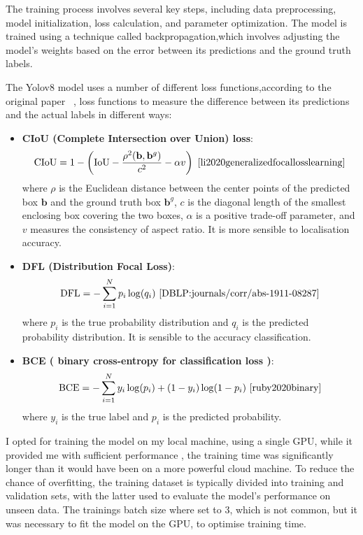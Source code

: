 The training process involves several key steps, including data preprocessing, model initialization,
loss calculation, and parameter optimization.
The model is trained using a technique called backpropagation,which involves adjusting the model's weights based on
the error between its predictions and the ground truth labels.

The Yolov8 model uses a number of different loss functions,according to the original paper~\cite{redmon2016lookonceunifiedrealtime}
, loss functions to measure the difference between its predictions and the actual labels in different ways:



\begin{itemize}
\item \textbf{CIoU (Complete Intersection over Union) loss}:
\[
\text{CIoU} = 1 - \left( \text{IoU} - \frac{\rho^2(\mathbf{b}, \mathbf{b}^g)}{c^2} - \alpha v \right) ~\cite{li2020generalizedfocallosslearning}
\]
where \(\rho\) is the Euclidean distance between the center points of the predicted box \(\mathbf{b}\) and
 the ground truth box \(\mathbf{b}^g\), \(c\) is the diagonal length of the smallest enclosing box covering
 the two boxes, \(\alpha\) is a positive trade-off parameter, and \(v\) measures the consistency of aspect
 ratio.
 It is more sensible to localisation accuracy.

\item \textbf{DFL (Distribution Focal Loss)}:
\[
\text{DFL} = -\sum_{i=1}^{N} p_i \log(q_i)~\cite{DBLP:journals/corr/abs-1911-08287}
\]
where \(p_i\) is the true probability distribution and \(q_i\) is the predicted probability distribution.
It is sensible to the accuracy classification.
\item \textbf{BCE (
binary cross-entropy for classification loss
)}:
\[
\text{BCE} = -\sum_{i=1}^{N} y_i \log(p_i) + (1 - y_i) \log(1 - p_i)~\cite{ruby2020binary}
\]
where \(y_i\) is the true label and \(p_i\) is the predicted probability.

\end{itemize}



I opted for training the model on my local machine, using a single GPU, while it provided me with sufficient performance
, the training time was significantly longer than it would have been on a more powerful cloud machine.
To reduce the chance of overfitting, the training dataset is typically divided into training and validation sets,
with the latter used to evaluate the model's performance on unseen data.
The trainings batch size where set to 3, which is not common, but it was necessary to fit the model on the GPU,
to optimise training time.

